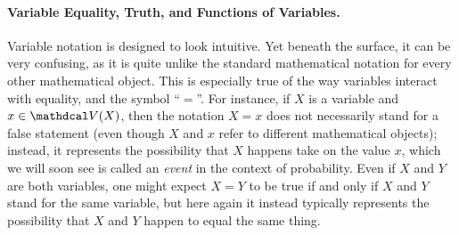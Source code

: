 \paragraph{Variable Equality, Truth, and Functions of Variables.}
Variable notation is designed to look intuitive. Yet beneath the surface, it can be very confusing, as it is quite unlike the standard mathematical notation for every other mathematical object.
This is especially true of the way variables interact with equality, and the symbol ``$=$''.
For instance, if $X$ is a variable and $x \in \V(X)$, then the notation $X{=}x$ does not necessarily stand for a false statement (even though $X$ and $x$ refer to different mathematical objects); instead, it represents the possibility that $X$ happens take on the value $x$, which we will soon see is called an \emph{event} in the context of probability. 
Even if $X$ and $Y$ are both variables, one might expect $X{=}Y$ to be true if and only if $X$ and $Y$ stand for the same variable, but here again it instead typically represents the possibility that $X$ and $Y$ happen to equal the same thing. 

